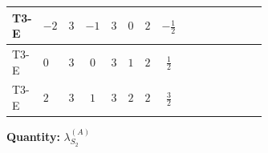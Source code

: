 \documentclass[8pt]{article}
\begin{document}
\begin{landscape}
\begin{longtable}{@{}llcccccc >{\raggedright\arraybackslash}p{0.21\linewidth} >{\raggedright\arraybackslash}p{0.21\linewidth} >{\raggedright\arraybackslash}p{0.21\linewidth}@{}}
T3-E & $-2$ & $3$ & $-1$ & $3$ & $0$ & $2$ & $-\frac{1}{2}$ & \scriptsize\adjustbox{max width=\linewidth}{$\begin{gathered} +3 {\lambda_{HS_2}^{(A)}}^2\end{gathered}$} & \scriptsize\adjustbox{max width=\linewidth}{$\begin{gathered} +\frac{7 {\lambda_{S_2}^{(1)}}^2}{4}\end{gathered}$} & \scriptsize\adjustbox{max width=\linewidth}{$\begin{gathered} +22 {\lambda_{S_2}^{(A)}}^2\end{gathered}$} \\
\midrule
T3-E & $0$ & $3$ & $0$ & $3$ & $1$ & $2$ & $\frac{1}{2}$ & \scriptsize\adjustbox{max width=\linewidth}{$\begin{gathered} +3 {\lambda_{HS_2}^{(A)}}^2\end{gathered}$} & \scriptsize\adjustbox{max width=\linewidth}{$\begin{gathered} +\frac{7 {\lambda_{S_2}^{(1)}}^2}{4}\end{gathered}$} & \scriptsize\adjustbox{max width=\linewidth}{$\begin{gathered} +22 {\lambda_{S_2}^{(A)}}^2\end{gathered}$} \\
\midrule
T3-E & $2$ & $3$ & $1$ & $3$ & $2$ & $2$ & $\frac{3}{2}$ & \scriptsize\adjustbox{max width=\linewidth}{$\begin{gathered} +3 {\lambda_{HS_2}^{(A)}}^2\end{gathered}$} & \scriptsize\adjustbox{max width=\linewidth}{$\begin{gathered} +\frac{7 {\lambda_{S_2}^{(1)}}^2}{4}\end{gathered}$} & \scriptsize\adjustbox{max width=\linewidth}{$\begin{gathered} +22 {\lambda_{S_2}^{(A)}}^2\end{gathered}$} \\
\midrule
\bottomrule
\end{longtable}
\clearpage
\noindent\textbf{Quantity: }$\lambda_{S_2}^{(A)}$\par\smallskip

\end{landscape}
\end{document}

